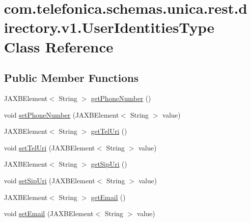 \hypertarget{classcom_1_1telefonica_1_1schemas_1_1unica_1_1rest_1_1directory_1_1v1_1_1UserIdentitiesType}{
\section{com.telefonica.schemas.unica.rest.directory.v1.UserIdentitiesType Class Reference}
\label{classcom_1_1telefonica_1_1schemas_1_1unica_1_1rest_1_1directory_1_1v1_1_1UserIdentitiesType}
}
\subsection*{Public Member Functions}
\begin{DoxyCompactItemize}
\item 
JAXBElement$<$ String $>$ \hyperlink{classcom_1_1telefonica_1_1schemas_1_1unica_1_1rest_1_1directory_1_1v1_1_1UserIdentitiesType_a7fe829fe0b4b566ca8222173e58c1ec6}{getPhoneNumber} ()
\item 
void \hyperlink{classcom_1_1telefonica_1_1schemas_1_1unica_1_1rest_1_1directory_1_1v1_1_1UserIdentitiesType_a8bd6f527d9cf4cdb46a0b330f53d6021}{setPhoneNumber} (JAXBElement$<$ String $>$ value)
\item 
JAXBElement$<$ String $>$ \hyperlink{classcom_1_1telefonica_1_1schemas_1_1unica_1_1rest_1_1directory_1_1v1_1_1UserIdentitiesType_a50e075a0d526994d528ac1cc5f7fb68a}{getTelUri} ()
\item 
void \hyperlink{classcom_1_1telefonica_1_1schemas_1_1unica_1_1rest_1_1directory_1_1v1_1_1UserIdentitiesType_a5e79b1d521633d56a6de18318e0cde98}{setTelUri} (JAXBElement$<$ String $>$ value)
\item 
JAXBElement$<$ String $>$ \hyperlink{classcom_1_1telefonica_1_1schemas_1_1unica_1_1rest_1_1directory_1_1v1_1_1UserIdentitiesType_a4ca084f70623e7fe13bc6d99d3af8ce4}{getSipUri} ()
\item 
void \hyperlink{classcom_1_1telefonica_1_1schemas_1_1unica_1_1rest_1_1directory_1_1v1_1_1UserIdentitiesType_ab31d36826ec7af7737bab5698d2b8a31}{setSipUri} (JAXBElement$<$ String $>$ value)
\item 
JAXBElement$<$ String $>$ \hyperlink{classcom_1_1telefonica_1_1schemas_1_1unica_1_1rest_1_1directory_1_1v1_1_1UserIdentitiesType_a1eed270a089826e8380de5172a723474}{getEmail} ()
\item 
void \hyperlink{classcom_1_1telefonica_1_1schemas_1_1unica_1_1rest_1_1directory_1_1v1_1_1UserIdentitiesType_af2b2412e0e85661e265b53402fcadd01}{setEmail} (JAXBElement$<$ String $>$ value)

\end{DoxyCompactItemize}
